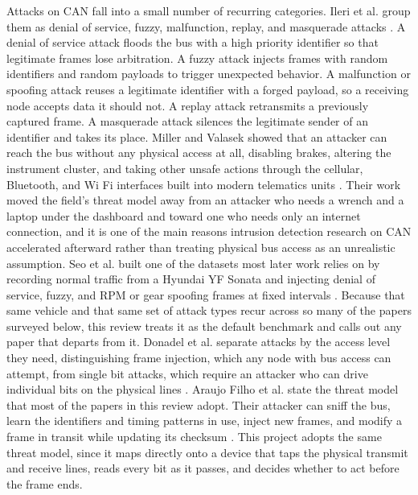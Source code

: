 \documentclass[11pt]{article}
\begin{document}
Attacks on CAN fall into a small number of recurring categories. Ileri et al. group them as denial of service, fuzzy, malfunction, replay, and masquerade attacks \cite{ileri2025}. A denial of service attack floods the bus with a high priority identifier so that legitimate frames lose arbitration. A fuzzy attack injects frames with random identifiers and random payloads to trigger unexpected behavior. A malfunction or spoofing attack reuses a legitimate identifier with a forged payload, so a receiving node accepts data it should not. A replay attack retransmits a previously captured frame. A masquerade attack silences the legitimate sender of an identifier and takes its place. Miller and Valasek showed that an attacker can reach the bus without any physical access at all, disabling brakes, altering the instrument cluster, and taking other unsafe actions through the cellular, Bluetooth, and Wi Fi interfaces built into modern telematics units \cite{millervalasek2015}. Their work moved the field's threat model away from an attacker who needs a wrench and a laptop under the dashboard and toward one who needs only an internet connection, and it is one of the main reasons intrusion detection research on CAN accelerated afterward rather than treating physical bus access as an unrealistic assumption. Seo et al. built one of the datasets most later work relies on by recording normal traffic from a Hyundai YF Sonata and injecting denial of service, fuzzy, and RPM or gear spoofing frames at fixed intervals \cite{seo2018}. Because that same vehicle and that same set of attack types recur across so many of the papers surveyed below, this review treats it as the default benchmark and calls out any paper that departs from it. Donadel et al. separate attacks by the access level they need, distinguishing frame injection, which any node with bus access can attempt, from single bit attacks, which require an attacker who can drive individual bits on the physical lines \cite{donadel2025}. Araujo Filho et al. state the threat model that most of the papers in this review adopt. Their attacker can sniff the bus, learn the identifiers and timing patterns in use, inject new frames, and modify a frame in transit while updating its checksum \cite{araujofilho2021}. This project adopts the same threat model, since it maps directly onto a device that taps the physical transmit and receive lines, reads every bit as it passes, and decides whether to act before the frame ends.
\end{document}
